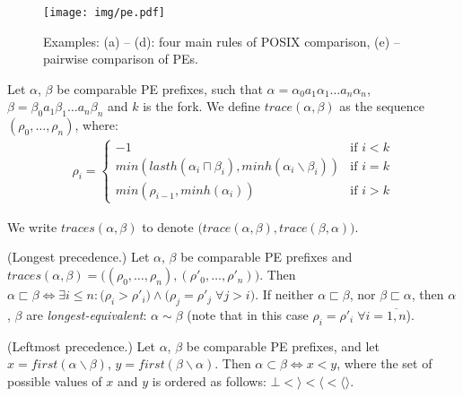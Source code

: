 \documentclass[AMA,STIX1COL]{WileyNJD-v2}
\newcommand{\Xl}{\langle}
\newcommand{\Xr}{\rangle}
\newcommand{\Xm}{\langle\!\rangle}
\begin{document}
\begin{figure}\label{fig_pe}
\texttt{[image: img/pe.pdf]}
\vspace{-2em}
\caption{
Examples: (a) -- (d): four main rules of POSIX comparison,
(e) -- pairwise comparison of PEs.
}
\end{figure}


    \begin{definition}
    \label{def_traces}
    Let $\alpha$, $\beta$ be comparable PE prefixes, such that
    $\alpha = \alpha_0 a_1 \alpha_1 \dots a_n \alpha_n$,
    $\beta = \beta_0 a_1 \beta_1 \dots a_n \beta_n$ and $k$ is the fork.
    We define $trace (\alpha, \beta)$ as the sequence $(\rho_0, \dots, \rho_n)$, where:
    \begin{align*}
    \rho_i = \begin{cases}
        -1 &\text{if } i < k \\[-0.2em]
        min (lasth (\alpha_i \sqcap \beta_i), minh(\alpha_i \backslash \beta_i)) &\text{if } i = k \\[-0.2em]
        min (\rho_{i-1}, minh(\alpha_i)) &\text{if } i > k
    \end{cases}
    \end{align*}

    We write $traces(\alpha, \beta)$ to denote $\big( trace (\alpha, \beta), trace (\beta, \alpha) \big)$.
    \end{definition}

    \begin{definition}\label{prec1}
    (Longest precedence.)
    Let $\alpha$, $\beta$ be comparable PE prefixes and
    $traces(\alpha, \beta) = \big( (\rho_0, \dots, \rho_n), (\rho'_0, \dots, \rho'_n) \big)$.
    Then $\alpha \sqsubset \beta \Leftrightarrow \exists i \leq n:
        \big( \rho_i > \rho'_i \big) \wedge
        \big( \rho_j = \rho'_j \; \forall j > i \big)$.
    If neither $\alpha \sqsubset \beta$, nor $\beta \sqsubset \alpha$,
    then $\alpha$, $\beta$ are \emph{longest-equivalent}: $\alpha \sim \beta$
    (note that in this case $\rho_i = \rho'_i \; \forall i = \overline {1, n}$).
    \end{definition}

    \begin{definition}\label{prec2}
    (Leftmost precedence.)
    Let $\alpha$, $\beta$ be comparable PE prefixes, and let
    $x = first (\alpha \backslash \beta)$,
    $y = first (\beta \backslash \alpha)$.
    Then $\alpha \subset \beta \Leftrightarrow x < y$, where
    the set of possible values of $x$ and $y$ is ordered as follows:
    $\bot < \Xr < \Xl < \Xm$.
    \end{definition}
\end{document}
